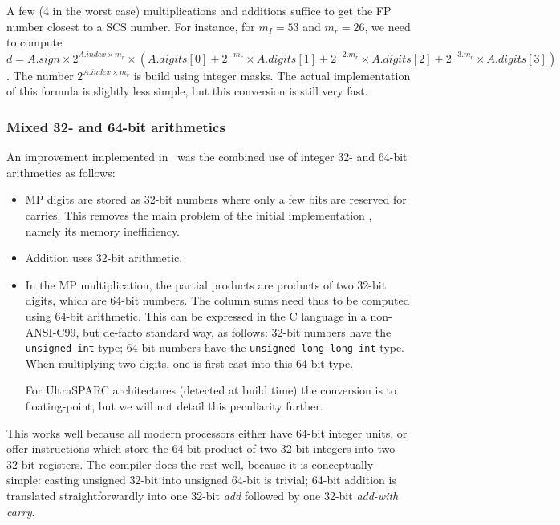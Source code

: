 A few (4 in the worst case) multiplications and additions suffice to
get the FP number closest to a SCS number.  For instance, for $m_I=53$
and $m_r=26$, we need to compute $d = A.sign \times 2^{A.index \times
  m_r} \times ( A.digits[0]+ 2^{-m_r} \times A.digits[1]+ 2^{-2.m_r}
\times A.digits[2]+ 2^{-3.m_r} \times A.digits[3])$. The number
$2^{A.index \times m_r}$ is build using integer masks. The actual
implementation of this formula is slightly less simple, but this
conversion is still very fast.


\subsubsection{Mixed 32- and 64-bit arithmetics}

An improvement implemented in \scslib\ was the combined use of integer 32- and 64-bit
arithmetics as follows: 

\begin{itemize}
\item MP digits are stored as 32-bit numbers where only a few bits are
  reserved for carries. This removes the main problem of the initial
implementation \cite{Dinechin2002b}, namely its memory inefficiency.

\item Addition uses 32-bit arithmetic. 

\item In the MP multiplication, the partial products are products of
  two 32-bit digits, which are 64-bit numbers. The column sums need
  thus to be computed using 64-bit arithmetic. This can be expressed
  in the C language in a non-ANSI-C99, but de-facto standard way, as
  follows: 32-bit numbers have the \texttt{unsigned int} type; 64-bit
  numbers have the \texttt{unsigned long long int} type. When
  multiplying two digits, one is first cast into this 64-bit type.
  
  For UltraSPARC architectures (detected at build time) the
  conversion is to floating-point, but we will not detail this
  peculiarity further.
\end{itemize}


This works well because all modern processors either have 64-bit
integer units, or offer instructions which store the 64-bit product of
two 32-bit integers into two 32-bit registers. The compiler does the
rest well, because it is conceptually simple: casting unsigned 32-bit
into unsigned 64-bit is trivial; 64-bit addition is translated
straightforwardly into one 32-bit \emph{add} followed by one 32-bit
\emph{add-with carry}.




